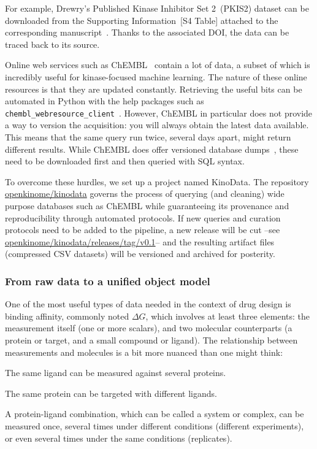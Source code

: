 \documentclass[9pt,lineno]{elife}
\begin{document}
For example, Drewry's Published Kinase Inhibitor Set 2~(PKIS2) dataset can be downloaded from the Supporting Information~\cite{drewry_2017_PLOS}[S4 Table] attached to the corresponding manuscript~\cite{drewry_2017_PLOS}. Thanks to the associated DOI, the data can be traced back to its source.

Online web services such as ChEMBL~\cite{chembl_May_2021} contain a lot of data, a subset of which is incredibly useful for kinase-focused machine learning. The nature of these online resources is that they are updated constantly. Retrieving the useful bits can be automated in Python with the help packages such as \texttt{chembl\_webresource\_client}~\cite{chemblweb_May_2021}. However, ChEMBL in particular does not provide a way to version the acquisition: you will always obtain the latest data available. This means that the same query run twice, several days apart, might return different results. While ChEMBL does offer versioned database dumps~\cite{chemblarchives_May_2021}, these need to be downloaded first and then queried with SQL syntax.

To overcome these hurdles, we set up a project named KinoData. The repository \href{https://github.com/openkinome/kinodata}{openkinome/kinodata} governs the process of querying (and cleaning) wide purpose databases such as ChEMBL while guaranteeing its provenance and reproducibility through automated protocols. If new queries and curation protocols need to be added to the pipeline, a new release will be cut --see \href{https://github.com/openkinome/kinodata/releases/tag/v0.1}{openkinome/kinodata/releases/tag/v0.1}-- and the resulting artifact files (compressed CSV datasets) will be versioned and archived for posterity.

\subsubsection{From raw data to a unified object model}

One of the most useful types of data needed in the context of drug design is binding affinity, commonly noted $\Delta G$, which involves at least three elements: the measurement itself (one or more scalars), and two molecular counterparts (a protein or target, and a small compound or ligand). The relationship between measurements and molecules is a bit more nuanced than one might think:

\begin{enumerate*}[label=(\roman*)]
    \item The same ligand can be measured against several proteins.
    \item The same protein can be targeted with different ligands.
    \item A protein-ligand combination, which can be called a system or complex, can be measured once, several times under different conditions (different experiments), or even several times under the same conditions (replicates).
\end{enumerate*}
\end{document}
